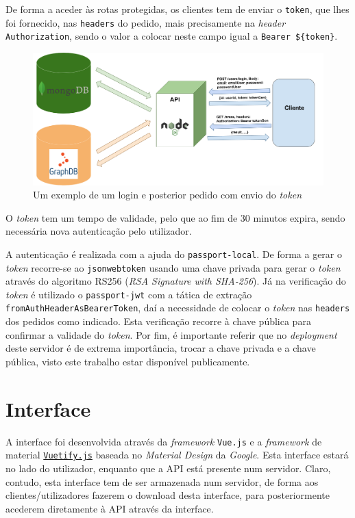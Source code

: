 \documentclass{article}
\begin{document}
De forma a aceder às rotas protegidas, os clientes tem de enviar o \texttt{token}, que lhes foi fornecido, nas \texttt{headers} do pedido, mais precisamente na \textit{header} \texttt{Authorization}, sendo o valor a colocar neste campo igual a \texttt{Bearer \$\{token\}}.

\begin{figure}[H]
    \centering
    \includegraphics[width=15cm]{Pictures/exeAuth.png}
    \caption{Um exemplo de um login e posterior pedido com envio do \textit{token}}
    \label{exe_auth}
\end{figure}

O \textit{token} tem um tempo de validade, pelo que ao fim de 30 minutos expira, sendo necessária nova autenticação pelo utilizador.

A autenticação é realizada com a ajuda do \texttt{passport-local}. De forma a gerar o \textit{token} recorre-se ao \texttt{jsonwebtoken} usando uma chave privada para gerar o \textit{token} através do algoritmo RS256 (\textit{RSA Signature with SHA-256}). Já na verificação do \textit{token} é utilizado o \texttt{passport-jwt} com a tática de extração \texttt{fromAuthHeaderAsBearerToken}, daí a necessidade de colocar o \textit{token} nas \texttt{headers} dos pedidos como indicado. Esta verificação recorre à chave pública para confirmar a validade do \textit{token}. Por fim, é importante referir que no \textit{deployment} deste servidor é de extrema importância, trocar a chave privada e a chave pública, visto este trabalho estar disponível publicamente.

\section{Interface} \label{interface}

A interface foi desenvolvida através da \textit{framework} \texttt{Vue.js} e a \textit{framework} de material \href{https://vuetifyjs.com/}{\texttt{Vuetify.js}} baseada no \textit{Material Design} da \textit{Google}. Esta interface estará no lado do utilizador, enquanto que a API está presente num servidor. Claro, contudo, esta interface tem de ser armazenada num servidor, de forma aos clientes/utilizadores fazerem o download desta interface, para posteriormente acederem diretamente à API através da interface.
\end{document}
